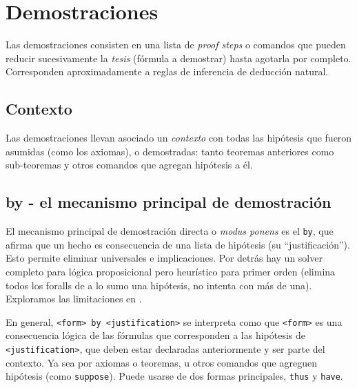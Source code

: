 \section{Demostraciones}

Las demostraciones consisten en una lista de \textit{proof steps} o comandos que
pueden reducir sucesivamente la \textit{tesis} (fórmula a demostrar) hasta
agotarla por completo. Corresponden aproximadamente a reglas de inferencia de
deducción natural.

\subsection{Contexto}

Las demostraciones llevan asociado un \textit{contexto} con todas las hipótesis
que fueron asumidas (como los axiomas), o demostradas: tanto teoremas anteriores
como sub-teoremas y otros comandos que agregan hipótesis a él.

\subsection{by - el mecanismo principal de demostración}

El mecanismo principal de demostración directa o \textit{modus ponens} es el
\lstinline{by}, que afirma que un hecho es consecuencia de una lista de
hipótesis (su ``justificación''). Esto permite eliminar universales e implicaciones. Por detrás hay un
solver completo para lógica proposicional pero heurístico para primer
orden (elimina todos los foralls de a lo sumo una hipótesis, no intenta con más
de una). Exploramos las limitaciones en .

En general, \lstinline{<form> by <justification>} se interpreta como que
\lstinline{<form>} es una consecuencia lógica de las fórmulas que corresponden a
las hipótesis de \lstinline{<justification>}, que deben estar declaradas
anteriormente y ser parte del contexto. Ya sea por axiomas o teoremas, u otros
comandos que agreguen hipótesis (como \lstinline{suppose}). Puede usarse de dos
formas principales, \lstinline{thus} y \lstinline{have}.


